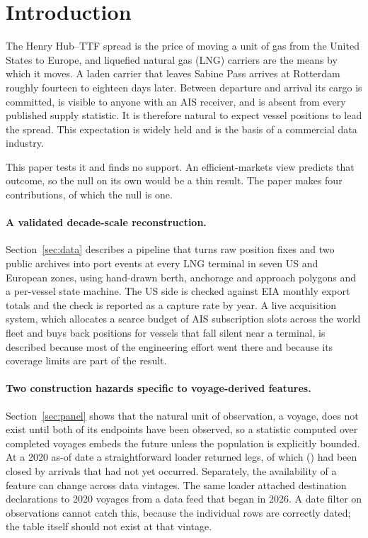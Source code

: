 \section{Introduction}

The Henry Hub--TTF spread is the price of moving a unit of gas from the United
States to Europe, and liquefied natural gas (LNG) carriers are the means by which it
moves. A laden carrier that leaves Sabine Pass arrives at Rotterdam roughly fourteen
to eighteen days later. Between departure and arrival its cargo is committed, is
visible to anyone with an AIS receiver, and is absent from every published supply
statistic. It is therefore natural to expect vessel positions to lead the spread.
This expectation is widely held and is the basis of a commercial data industry.

This paper tests it and finds no support. An efficient-markets view predicts that
outcome, so the null on its own would be a thin result. The paper makes four
contributions, of which the null is one.

\paragraph{A validated decade-scale reconstruction.} Section~\ref{sec:data}
describes a pipeline that turns \nFixes{} raw position fixes and two public
archives into \nEvents{} port events at every LNG terminal in seven US and European
zones, using hand-drawn berth, anchorage and approach polygons and a per-vessel
state machine. The US side is checked against EIA monthly export totals and the
check is reported as a capture rate by year. A live acquisition system, which
allocates a scarce budget of AIS subscription slots across the world fleet and buys
back positions for vessels that fall silent near a terminal, is described because
most of the engineering effort went there and because its coverage limits are part
of the result.

\paragraph{Two construction hazards specific to voyage-derived features.}
Section~\ref{sec:panel} shows that the natural unit of observation, a voyage, does
not exist until both of its endpoints have been observed, so a statistic computed
over completed voyages embeds the future unless the population is explicitly
bounded. At a 2020 as-of date a straightforward loader returned \leakNaive{} legs,
of which \leakFutureClosed{} (\leakFutureShare) had been closed by arrivals that
had not yet occurred. Separately, the availability of a feature can change across
data vintages. The same loader attached \leakDeclared{} destination declarations
to 2020 voyages from a data feed that began in 2026. A date filter on observations
cannot catch this, because the individual rows are correctly dated; the table itself
should not exist at that vintage.

